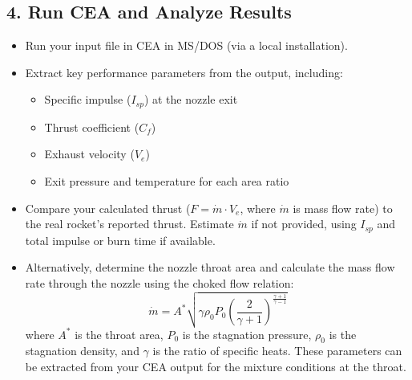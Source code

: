 \documentclass[12pt]{article}
\begin{document}
\subsection{4. Run CEA and Analyze Results}
\begin{itemize}
    \item Run your input file in CEA in MS/DOS (via a local installation).
    \item Extract key performance parameters from the output, including:
    \begin{itemize}
        \item Specific impulse ($I_{sp}$) at the nozzle exit
        \item Thrust coefficient ($C_f$)
        \item Exhaust velocity ($V_e$)
        \item Exit pressure and temperature for each area ratio
    \end{itemize}
    \item Compare your calculated thrust ($F = \dot{m} \cdot V_e$, where $\dot{m}$ is mass flow rate) to the real rocket's reported thrust. Estimate $\dot{m}$ if not provided, using $I_{sp}$ and total impulse or burn time if available.
    \item Alternatively, determine the nozzle throat area and calculate the mass flow rate through the nozzle using the choked flow relation:
    \begin{equation}
        \dot{m} = A^* \sqrt{\gamma \rho_0 P_0 \left( \frac{2}{\gamma+1} \right)^{\frac{\gamma+1}{\gamma-1}}}
    \end{equation}
    where $A^*$ is the throat area, $P_0$ is the stagnation pressure, $\rho_0$ is the stagnation density, and $\gamma$ is the ratio of specific heats. These parameters can be extracted from your CEA output for the mixture conditions at the throat.
\end{itemize}
\end{document}
